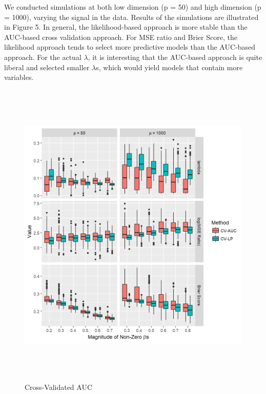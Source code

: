 \par We conducted simulations at both low dimension (p = 50) and high dimension (p = 1000), varying the signal in the data. Results of the simulations are illustrated in Figure 5. In general, the likelihood-based approach is more stable than the AUC-based cross validation approach. For MSE ratio and Brier Score, the likelihood approach tends to select more predictive models than the AUC-based approach. For the actual $\lambda$, it is interesting that the AUC-based approach is quite liberal and selected smaller $\lambda$s, which would yield models that contain more variables. 

\begin{figure}[h]
    \centering
		\includegraphics[height= 15cm ]{./figures/figure_auc.png}
    \caption{Cross-Validated AUC}
\end{figure}	

